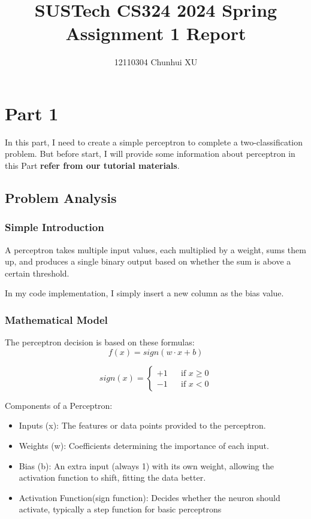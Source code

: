 \documentclass{article}
\title{SUSTech CS324 2024 Spring Assignment 1 Report}
\author{12110304 Chunhui XU}
\begin{document}
\maketitle

\section{Part 1}

In this part, I need to create a simple perceptron to complete a two-classification problem. But before start, I will provide some information about perceptron in this Part \textbf{refer from our tutorial materials}.

\subsection{Problem Analysis}

\subsubsection{Simple Introduction}

A perceptron takes multiple input values, each multiplied by a weight, sums them up, and produces
a single binary output based on whether the sum is above a certain threshold.

In my code implementation, I simply insert a new column as the bias value.


\subsubsection{Mathematical Model}

The perceptron decision is based on these formulas:
$$
    f(x) = sign(w\cdot x+b)
$$

$$
sign(x)=
\left\{
    \begin{aligned}
        +1 && \text{if $x \geq 0$}\\
        -1 && \text{if $x < 0$}
    \end{aligned}
\right.
$$

Components of a Perceptron:

\begin{itemize}
    \item Inputs (x): The features or data points provided to the perceptron.
    \item Weights (w): Coefficients determining the importance of each input.
    \item Bias (b): An extra input (always 1) with its own weight, allowing the activation function to shift,
fitting the data better.
    \item Activation Function(sign function): Decides whether the neuron should activate, typically a
step function for basic perceptrons
\end{itemize}
\end{document}
